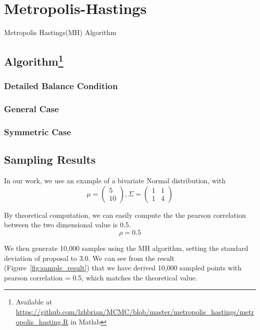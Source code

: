 
\section{Metropolis-Hastings} \label{sec:metropolis_hastings}
Metropolis Hastings(MH) Algorithm

\subsection{Algorithm\protect\footnote{Available at \protect\url{https://github.com/lzhbrian/MCMC/blob/master/metropolis_hastings/metropolis_hasting.R} in Matlab}}

\subsubsection{Detailed Balance Condition}

\subsubsection{General Case}

\subsubsection{Symmetric Case}




\subsection{Sampling Results}
In our work, we use an example of a bivariate Normal distribution, with
$$ \mu = \left( \begin{array}{ccc}
5 \\
10 \end{array} \right), 
\Sigma = \left( \begin{array}{ccc}
1 & 1\\
1 & 4\end{array} \right)$$

By theoretical computation, we can easily compute the the pearson correlation between the two dimensional value is 0.5.
$$ \rho = 0.5 $$

We then generate 10,000 samples using the MH algorithm, setting the standard deviation of proposal to 3.0. We can see from the result (Figure~\ref{fig:sample_result}) that we have derived 10,000 sampled points with pearson correlation = 0.5, which matches the theoretical value.

